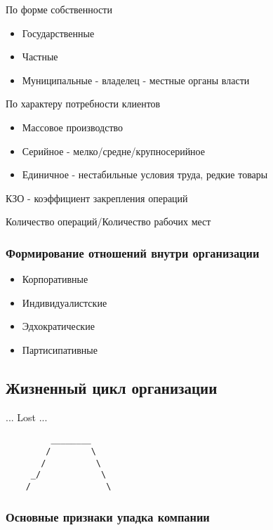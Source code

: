 \documentclass[a4paper,12pt]{report}
\begin{document}
	По форме собственности
	\begin{itemize}
		\item Государственные
		\item Частные
		\item Муниципальные - владелец - местные органы власти
	\end{itemize}

	По характеру потребности клиентов
	\begin{itemize}
		\item	Массовое производство
		\item	Серийное - мелко/средне/крупносерийное
		\item	Единичное - нестабильные условия труда, редкие товары
	\end{itemize}

	КЗО - коэффициент закрепления операций

	Количество операций/Количество рабочих мест

\subsubsection{Формирование отношений внутри организации}
	\begin{itemize}
		\item	Корпоративные
		\item	Индивидуалистские
		\item	Эдхократические
		\item	Партисипативные
	\end{itemize}






\subsection{Жизненный цикл организации}

	... Lost ...

	\begin{verbatim}
	     ________
	    /        \
	   /          \
	 _/            \
	/               \
	\end{verbatim}


\subsubsection{Основные признаки упадка компании}
\end{document}

